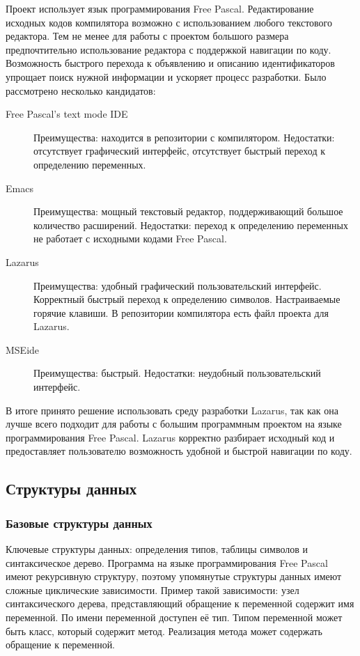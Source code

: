 \documentclass{imcs}
\begin{document}
Проект использует язык программирования Free Pascal. Редактирование исходных кодов
компилятора возможно с использованием любого текстового редактора. Тем не менее
для работы с проектом большого размера предпочтительно использование редактора с
поддержкой навигации по коду. Возможность быстрого перехода к объявлению и описанию
идентификаторов упрощает поиск нужной информации и ускоряет процесс разработки.
Было рассмотрено несколько кандидатов:
\begin{description}
  \item[Free Pascal's text mode IDE] Преимущества: находится в репозитории с 
компилятором. Недостатки: отсутствует графический интерфейс, отсутствует
быстрый переход к определению переменных.
  \item[Emacs] Преимущества: мощный текстовый редактор, поддерживающий большое
количество расширений. Недостатки: переход к определению переменных не работает
с исходными кодами Free Pascal.
  \item[Lazarus] Преимущества: удобный графический пользовательский интерфейс.
Корректный быстрый переход к определению символов. Настраиваемые горячие клавиши.
В репозитории компилятора есть файл проекта для Lazarus.
  \item[MSEide] Преимущества: быстрый. Недостатки: неудобный 
пользовательский интерфейс.
\end{description} 
В итоге принято решение использовать среду разработки Lazarus, так как она
лучше всего подходит для работы с большим программным проектом на
языке программирования Free Pascal. Lazarus корректно разбирает
исходный код и предоставляет пользователю возможность удобной и
быстрой навигации по коду.

\fi

\subsection{Структуры данных}

\subsubsection{Базовые структуры данных}

Ключевые структуры данных: определения типов, таблицы символов и
синтаксическое дерево. Программа на языке программирования Free Pascal имеют рекурсивную структуру,
поэтому упомянутые структуры данных имеют сложные циклические зависимости. Пример такой 
зависимости: узел синтаксического дерева, представляющий обращение к переменной содержит имя
переменной. По имени переменной доступен её тип. Типом переменной может быть класс, который
содержит метод. Реализация метода  может содержать обращение к переменной.
\end{document}
